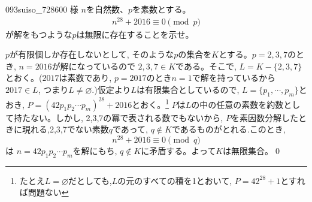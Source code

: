 \begin{prob}{093}{}{suiso\_728600 様}
 $n$を自然数、$p$を素数とする。
 \begin{align*}
  n^{28}+2016 \equiv 0 \pmod p
 \end{align*}
 が解をもつような$p$は無限に存在することを示せ。
\end{prob}

$p$が有限個しか存在しないとして, そのような$p$の集合を$K$とする。$p=2,3,7$のとき, $n=2016$が解になっているので $2,3,7\in K$である。そこで, $L=K-\{2,3,7\}$とおく。($2017$は素数であり, $p=2017$のとき$n=1$で解を持っているから $2017\in L$, つまり$L\neq \varnothing$.)仮定より$L$は有限集合としているので, $L=\{p_1,\cdots, p_m\}$とおき, $P=(42p_1p_2\cdots p_m)^{28} +2016$とおく。\footnote{たとえ$L=\varnothing$だとしても,$L$の元のすべての積を1とおいて, $P=42^{28}+1$とすれば問題ない} $P$は$L$の中の任意の素数を約数として持たない。しかし, 2,3,7の冪で表される数でもないから, $P$を素因数分解したときに現れる,2,3,7でない素数$q$であって, $q\notin K$であるものがとれる.このとき,  
\[n^{28}+2016\equiv 0 \pmod{q} \]
は $n=42p_1p_2\cdots p_m$を解にもち, $q\notin K$に矛盾する。よって$K$は無限集合。\qed
